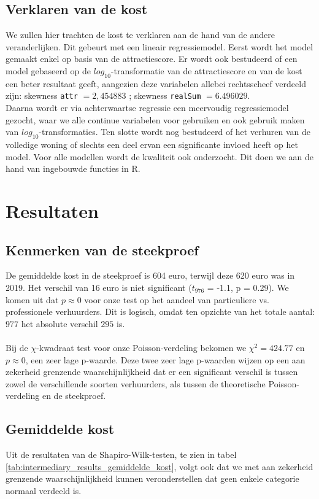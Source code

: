 \documentclass[a4paper]{kulakarticle}
\begin{document}
	\subsection{Verklaren van de kost}
	
	We zullen hier trachten de kost te verklaren aan de hand van de andere veranderlijken. Dit gebeurt met een lineair regressiemodel. Eerst wordt het model gemaakt enkel op basis van de attractiescore. Er wordt ook bestudeerd of een model gebaseerd op de $log_{10}$-transformatie van de attractiescore en van de kost een beter resultaat geeft, aangezien deze variabelen allebei rechtsscheef verdeeld zijn: skewness \verb|attr| $=2,454883$ ; skewness \verb|realSum| $=6.496029$.\\
	Daarna wordt er via achterwaartse regressie een meervoudig regressiemodel gezocht, waar we alle continue variabelen voor gebruiken en ook gebruik maken van  $log_{10}$-transformaties. Ten slotte wordt nog bestudeerd of het verhuren van de volledige woning of slechts een deel ervan een significante invloed heeft op het model. Voor alle modellen wordt de kwaliteit ook onderzocht. Dit doen we aan de hand van ingebouwde functies in R.
	\section{Resultaten}
	
	\subsection{Kenmerken van de steekproef}
	De gemiddelde kost in de steekproef is 604 euro, terwijl deze  620 euro was in 2019. Het verschil van 16 euro is niet significant ($t_{976}$ = -1.1, p = 0.29). We komen uit dat $p \approx 0$ voor onze test op het aandeel van particuliere vs. professionele verhuurders. Dit is logisch, omdat ten opzichte van het totale aantal: $977$ het absolute verschil $295$ is.\\\\
	Bij de $\chi$-kwadraat test voor onze Poisson-verdeling bekomen we $\chi^2 = 424.77$ en $p \approx 0$, een zeer lage p-waarde. Deze twee zeer lage p-waarden wijzen op een aan zekerheid grenzende waarschijnlijkheid dat er een significant verschil is tussen zowel de verschillende soorten verhuurders, als tussen de theoretische Poisson-verdeling en de steekproef.
	
	\subsection{Gemiddelde kost}
	 Uit de resultaten van de Shapiro-Wilk-testen, te zien in tabel \ref{tab:intermediary_results_gemiddelde_kost}, volgt ook dat we met aan zekerheid grenzende waarschijnlijkheid kunnen veronderstellen dat geen enkele categorie normaal verdeeld is.
	
\end{document}
